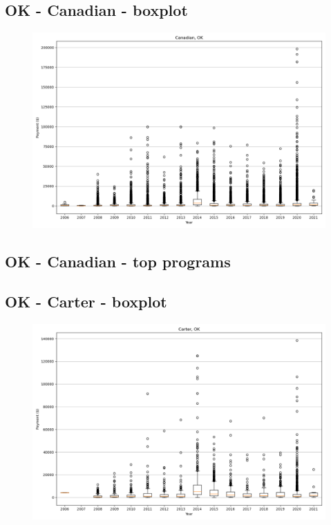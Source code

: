 \subsection*{OK - Canadian - boxplot}
\begin{figure}[h]
\centering
\includegraphics[width=7in]{../output/boxplots/counties/Canadian-OK_boxplot.png}
\end{figure}


\subsection*{OK - Canadian - top programs}

\newpage
\subsection*{OK - Carter - boxplot}
\begin{figure}[h]
\centering
\includegraphics[width=7in]{../output/boxplots/counties/Carter-OK_boxplot.png}
\end{figure}


